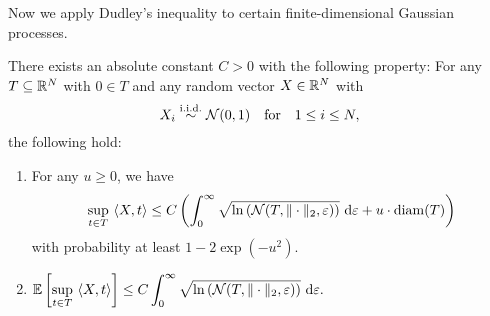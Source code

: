 Now we apply Dudley's inequality to certain finite-dimensional Gaussian processes.

\begin{proposition}\label{prop:dudley}
There exists an absolute constant $C>0$ with the following property: For any $T \subseteq \mathbb{R}^N$ with $0 \in T$ and any random vector $X \in \mathbb{R}^N$ with 
\begin{equation*}
X_i \overset{\mathrm{i.i.d.}}{\sim} \mathcal{N}(0,1) \quad \text{for} \quad 1 \leq i \leq N,
\end{equation*}
 the following hold:
 \begin{enumerate}
 \item{ For any $u \geq 0$, we have
 \begin{equation*}
 \underset{t \in T}{\sup} \ \langle X, t \rangle \leq  C \left(\int_0^\infty \sqrt{\ln \left(\mathcal{N}(T, \Vert \cdot \Vert_2, \varepsilon)\right)} \ \mathrm{d} \varepsilon + u \cdot \operatorname{diam}(T)\right)
 \end{equation*}
 with probability at least $1 - 2 \exp(-u^2)$.
 }
 \item{
 $ \displaystyle
 \mathbb{E} \left[ \underset{t \in T}{\sup} \ \langle X, t \rangle\right] \leq C\int_0^\infty \sqrt{\ln \left(\mathcal{N}(T, \Vert \cdot \Vert_2, \varepsilon)\right)} \ \mathrm{d} \varepsilon.
 $
 }
 \end{enumerate}
\end{proposition}
